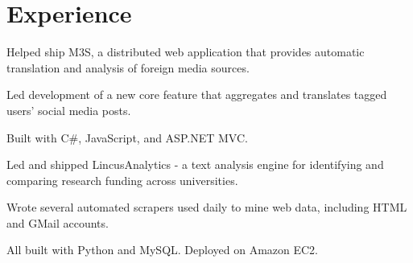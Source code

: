 \documentclass[]{deedy-resume}
\begin{document}
\begin{minipage}[t]{0.61\textwidth}


\section{Experience}
\vspace{\topsep} %
\begin{tightemize}
\item Helped ship M3S, a distributed web application that provides automatic translation and analysis of foreign media sources.
\item Led development of a new core feature that aggregates and translates tagged users' social media posts.
\item Built with C\#, JavaScript, and ASP.NET MVC.
\end{tightemize}
\sectionsep

\begin{tightemize}
\item Led and shipped LincusAnalytics - a text analysis engine for identifying and comparing research funding across universities.
\item Wrote several automated scrapers used daily to mine web data, including HTML and GMail accounts.
\item All built with Python and MySQL. Deployed on Amazon EC2.
\end{tightemize}
\sectionsep



\end{minipage}
\end{document}
